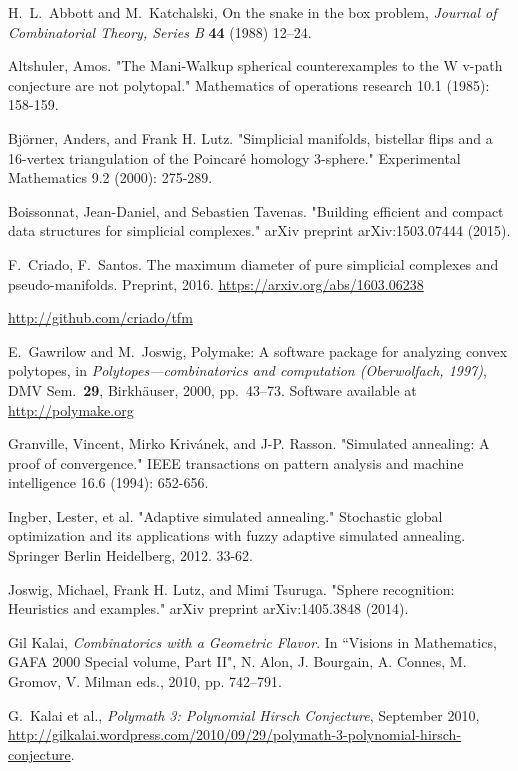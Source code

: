 \documentclass[12pt,a4paper]{article}
\theoremstyle{plain}
\theoremstyle{definition}
\begin{document}
\begin{thebibliography}{99}
H.~L.~Abbott and M.~Katchalski, On the snake in the box problem, \emph{Journal of Combinatorial Theory, Series B} {\bf 44} (1988) 12--24.

  Altshuler, Amos. "The Mani-Walkup spherical counterexamples to the W v-path conjecture are not polytopal." Mathematics of operations research 10.1 (1985): 158-159.

  Björner, Anders, and Frank H. Lutz. "Simplicial manifolds, bistellar flips and a 16-vertex triangulation of the Poincaré homology 3-sphere." Experimental Mathematics 9.2 (2000): 275-289.

  Boissonnat, Jean-Daniel, and Sebastien Tavenas. "Building efficient and compact data structures for simplicial complexes." arXiv preprint arXiv:1503.07444 (2015).

  F.~Criado, F.~Santos.
  The maximum diameter of pure simplicial complexes and pseudo-manifolds.
  Preprint, 2016.
  \url{https://arxiv.org/abs/1603.06238}

  \url{http://github.com/criado/tfm}

E.~Gawrilow and M.~Joswig,
Polymake: A software package for analyzing convex polytopes,
in \emph{Polytopes---combinatorics and computation (Oberwolfach, 1997)},
DMV Sem.~\textbf{29}, Birkh\"auser, 2000, pp.~43--73.
Software available at \url{http://polymake.org}

  Granville, Vincent, Mirko Krivánek, and J-P. Rasson. "Simulated annealing: A proof of convergence." IEEE transactions on pattern analysis and machine intelligence 16.6 (1994): 652-656.

  Ingber, Lester, et al. "Adaptive simulated annealing." Stochastic global optimization and its applications with fuzzy adaptive simulated annealing. Springer Berlin Heidelberg, 2012. 33-62.

  Joswig, Michael, Frank H. Lutz, and Mimi Tsuruga. "Sphere recognition: Heuristics and examples." arXiv preprint arXiv:1405.3848 (2014).

Gil Kalai, \emph{Combinatorics with a Geometric Flavor}.
In ``Visions in Mathematics, GAFA 2000 Special volume, Part II",
N. Alon, J. Bourgain, A. Connes, M. Gromov, V. Milman eds., 2010, pp. 742--791.

G.~Kalai et al., \emph{Polymath 3: Polynomial Hirsch Conjecture}, September 2010,
\href{http://gilkalai.wordpress.com/2010/09/29/polymath-3-polynomial-hirsch-conjecture}
{http://gilkalai.wordpress.com/2010/09/29/polymath-3-polynomial-hirsch-conjecture}.


\end{thebibliography}
\end{document}
